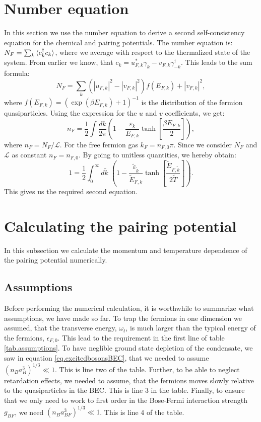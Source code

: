 \section{Number equation} \label{sec.chemicalpotential.numberequation}
In this section we use the number equation to derive a second self-consistency equation for the chemical and pairing potentials. The number equation is: $N_F = \sum_k \braket { c_k^\dagger c_k }$, where we average with respect to the thermalized state of the system. From earlier we know, that $c_k = u_{F,k}^* \gamma_k -v_{F,k} \gamma_{-k}^\dagger$. This leads to the sum formula:
\begin{equation}
N_F = \sum_k \left(|u_{F,k}|^2-|v_{F,k}|^2\right) f(E_{F,k}) + |v_{F,k}|^2,\nonumber
\end{equation}
where $f(E_{F,k}) = (\exp(\beta E_{F,k}) + 1)^{-1}$ is the distribution of the fermion quasiparticles. Using the expression for the $u$ and $v$ coefficients, we get:
\begin{equation}
n_F = \frac{1}{2}\int \frac{dk}{2\pi} \left( 1 - \frac{\varepsilon_k}{E_{F,k}}\tanh\left[\frac{\beta E_{F,k}}{2}\right] \right), \nonumber
\end{equation}
where $n_F = N_F/\mathcal{L}$. For the free fermion gas $k_F = n_{F,0}\pi$. Since we consider $N_F$ and $\mathcal{L}$ as constant $n_F = n_{F,0}$. By going to unitless quantities, we hereby obtain:
\begin{equation}
1 = \frac{1}{2}\int_0^\infty d\tilde{k} \; \left( 1 - \frac{\tilde{\varepsilon}_{\tilde{k}}}{\tilde{E}_{F,k}}\tanh\left[\frac{\tilde{E}_{F,\tilde{k}}}{2\tilde{T}}\right] \right). 
\label{eq.NumberEquationUnitless}
\end{equation}
This gives us the required second equation.


\section{Calculating the pairing potential} \label{sec.pairingandchemicalpotential.numericalcalculation}
In this subsection we calculate the momentum and temperature dependence of the pairing potential numerically. 

\subsection{Assumptions}
Before performing the numerical calculation, it is worthwhile to summarize what assumptions, we have made so far. To trap the fermions in one dimension we assumed, that the transverse energy, $\omega_t$, is much larger than the typical energy of the fermions, $\epsilon_{F,0}$. This lead to the requirement in the first line of table \ref{tab.assumptions}. To have neglible ground state depletion of the condensate, we saw in equation \eqref{eq.excitedbosonsBEC}, that we needed to assume $(n_Ba_B^3)^{1/3}\ll 1$. This is line two of the table. Further, to be able to neglect retardation effects, we needed to assume, that the fermions moves slowly relative to the quasiparticles in the BEC. This is line 3 in the table. Finally, to ensure that we only need to work to first order in the Bose-Fermi interaction strength $g_{BF}$, we need $(n_Ba_{BF}^3)^{1/3} \ll 1$. This is line 4 of the table. 

